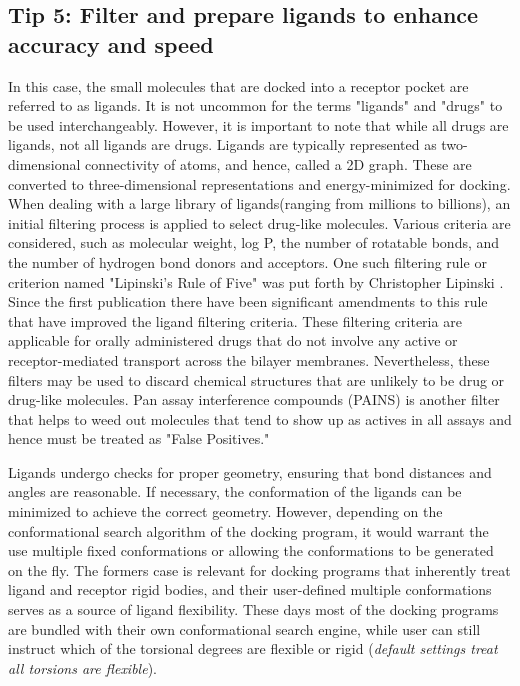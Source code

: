 \documentclass[10pt,letterpaper]{article}
\begin{document}
{{\subsection*{Tip 5: Filter and prepare ligands to enhance accuracy and speed}
In this case, the small molecules that are docked into a receptor pocket are referred to as ligands. It is not uncommon for the terms "ligands" and "drugs" to be used interchangeably. However, it is important to note that while all drugs are ligands, not all ligands are drugs. Ligands are typically represented as two-dimensional connectivity of atoms, and hence, called a 2D graph. These are converted to three-dimensional representations  and energy-minimized for docking.  When dealing with a large library of ligands\cite{bib10}(ranging from millions to billions), an initial filtering process is applied to select drug-like molecules. Various criteria are considered, such as molecular weight, log P, the number of rotatable bonds, and the number of hydrogen bond donors and acceptors. One such filtering  rule or criterion named "Lipinski's  Rule of Five" was put forth by Christopher Lipinski \cite{bib11}. Since the first publication there have been significant amendments to this rule that have improved the ligand filtering criteria\cite{bib12}. These filtering criteria are applicable for orally administered drugs that do not involve any active or receptor-mediated transport across the bilayer membranes. Nevertheless, these filters may be used to discard chemical structures that are unlikely to be drug or drug-like molecules. Pan assay interference compounds (PAINS)\cite{bib63, bib64} is another filter that helps to weed out molecules that tend to show up as actives in all assays and hence must be treated as "False Positives."

Ligands undergo checks for proper geometry, ensuring that bond distances and angles are reasonable. If necessary, the conformation of the ligands can be minimized to achieve the correct geometry. However, depending on the conformational search algorithm of the docking program, it would warrant the use multiple fixed conformations or allowing the conformations to be generated on the fly. The formers case is relevant for docking programs that inherently treat ligand and receptor rigid bodies, and their user-defined multiple conformations serves as a source of ligand flexibility. These days most of the docking programs are bundled with their own conformational search engine, while user can still instruct which of the torsional degrees are flexible or rigid (\textit{default settings treat all torsions are flexible}).

}}
\end{document}
